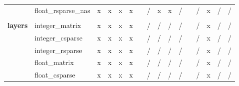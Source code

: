 \documentclass{article}
\begin{document}
\begin{longtable}{llllllllllllllll}
                & float\_rsparse\_nas       & \cellcolor[HTML]{B7E1CD}x & \cellcolor[HTML]{B7E1CD}x & \cellcolor[HTML]{B7E1CD}x & \cellcolor[HTML]{B7E1CD}x &  & \cellcolor[HTML]{F4CCCC}/ & \cellcolor[HTML]{B7E1CD}x & \cellcolor[HTML]{B7E1CD}x & \cellcolor[HTML]{F4CCCC}/ &  & \cellcolor[HTML]{F4CCCC}/ & \cellcolor[HTML]{B7E1CD}x & \cellcolor[HTML]{F4CCCC}/ & \cellcolor[HTML]{F4CCCC}/ \\
                &                           &                           &                           &                           &                           &  &                           &                           &                           &                           &  &                           &                           &                           &                           \\
\textbf{layers} & integer\_matrix           & \cellcolor[HTML]{B7E1CD}x & \cellcolor[HTML]{B7E1CD}x & \cellcolor[HTML]{B7E1CD}x & \cellcolor[HTML]{B7E1CD}x &  & \cellcolor[HTML]{F4CCCC}/ & \cellcolor[HTML]{F4CCCC}/ & \cellcolor[HTML]{F4CCCC}/ & \cellcolor[HTML]{F4CCCC}/ &  & \cellcolor[HTML]{F4CCCC}/ & \cellcolor[HTML]{B7E1CD}x & \cellcolor[HTML]{F4CCCC}/ & \cellcolor[HTML]{F4CCCC}/ \\
                & integer\_csparse          & \cellcolor[HTML]{B7E1CD}x & \cellcolor[HTML]{B7E1CD}x & \cellcolor[HTML]{B7E1CD}x & \cellcolor[HTML]{B7E1CD}x &  & \cellcolor[HTML]{F4CCCC}/ & \cellcolor[HTML]{F4CCCC}/ & \cellcolor[HTML]{F4CCCC}/ & \cellcolor[HTML]{F4CCCC}/ &  & \cellcolor[HTML]{F4CCCC}/ & \cellcolor[HTML]{B7E1CD}x & \cellcolor[HTML]{F4CCCC}/ & \cellcolor[HTML]{F4CCCC}/ \\
                & integer\_rsparse          & \cellcolor[HTML]{B7E1CD}x & \cellcolor[HTML]{B7E1CD}x & \cellcolor[HTML]{B7E1CD}x & \cellcolor[HTML]{B7E1CD}x &  & \cellcolor[HTML]{F4CCCC}/ & \cellcolor[HTML]{F4CCCC}/ & \cellcolor[HTML]{F4CCCC}/ & \cellcolor[HTML]{F4CCCC}/ &  & \cellcolor[HTML]{F4CCCC}/ & \cellcolor[HTML]{B7E1CD}x & \cellcolor[HTML]{F4CCCC}/ & \cellcolor[HTML]{F4CCCC}/ \\
                & float\_matrix             & \cellcolor[HTML]{B7E1CD}x & \cellcolor[HTML]{B7E1CD}x & \cellcolor[HTML]{B7E1CD}x & \cellcolor[HTML]{B7E1CD}x &  & \cellcolor[HTML]{F4CCCC}/ & \cellcolor[HTML]{F4CCCC}/ & \cellcolor[HTML]{F4CCCC}/ & \cellcolor[HTML]{F4CCCC}/ &  & \cellcolor[HTML]{F4CCCC}/ & \cellcolor[HTML]{B7E1CD}x & \cellcolor[HTML]{F4CCCC}/ & \cellcolor[HTML]{F4CCCC}/ \\
                & float\_csparse            & \cellcolor[HTML]{B7E1CD}x & \cellcolor[HTML]{B7E1CD}x & \cellcolor[HTML]{B7E1CD}x & \cellcolor[HTML]{B7E1CD}x &  & \cellcolor[HTML]{F4CCCC}/ & \cellcolor[HTML]{F4CCCC}/ & \cellcolor[HTML]{F4CCCC}/ & \cellcolor[HTML]{F4CCCC}/ &  & \cellcolor[HTML]{F4CCCC}/ & \cellcolor[HTML]{B7E1CD}x & \cellcolor[HTML]{F4CCCC}/ & \cellcolor[HTML]{F4CCCC}/ \\

\end{longtable}
\end{document}
